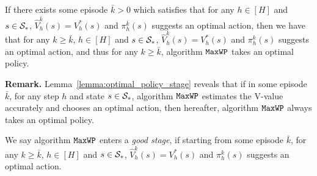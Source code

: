 \begin{lemma} \label{lemma:optimal_policy_stage}
	If there exists some episode $\bar{k}>0$ which satisfies that for any $h \in [H]$ and $s \in \mathcal{S}_*$, $\hat{V}^{\bar{k}}_h(s)=V^{*}_h(s)$ and $\pi^{\bar{k}}_h(s)$ suggests an optimal action, then we have that for any $k \geq \bar{k}$, $h \in [H]$ and $s \in \mathcal{S}_*$, $\hat{V}^{k}_h(s)=V^{*}_h(s)$ and $\pi^{k}_h(s)$ suggests an optimal action, and thus for any $k \geq \bar{k}$, algorithm $\mathtt{MaxWP}$ takes an optimal policy.
\end{lemma}

\textbf{Remark.} Lemma~\ref{lemma:optimal_policy_stage} reveals that if in some episode $\bar{k}$, for any step $h$ and state $s \in \mathcal{S}_*$, algorithm $\mathtt{MaxWP}$ estimates the V-value accurately and chooses an optimal action, then hereafter, algorithm $\mathtt{MaxWP}$ always takes an optimal policy. 

We say algorithm $\mathtt{MaxWP}$ enters a \emph{good stage}, if starting from some episode $\bar{k}$, for any $k \geq \bar{k}$, $h \in [H]$ and $s \in \mathcal{S}_*$, $\hat{V}^{k}_h(s)=V^{*}_h(s)$ and $\pi^{k}_h(s)$ suggests an optimal action.

